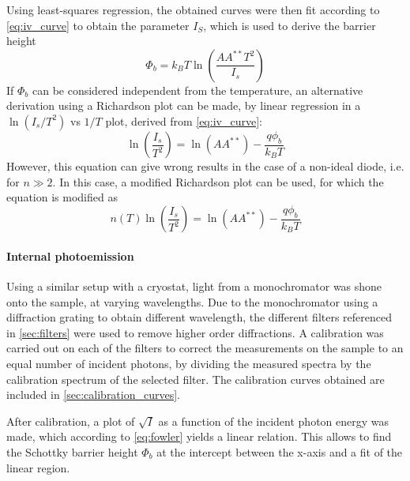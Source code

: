Using least-squares regression, the obtained curves were then fit according to \autoref{eq:iv_curve} to obtain the parameter $I_S$, which is used to derive the barrier height
\begin{equation}
    \Phi_b = k_B T \ln\left(\frac{A A^{**} T^2}{I_s}\right)
\end{equation}
If $\Phi_b$ can be considered independent from the temperature, an alternative derivation using a Richardson plot can be made, by linear regression in a $\ln(I_s/T^2)$ vs $1/T$ plot, derived from \autoref{eq:iv_curve}:
\begin{equation} \label{eq:richardson}
    \ln \left(\frac{I_s}{T^2}\right) = \ln(A A^{**}) - \frac{q \phi_b}{k_B T}
\end{equation}
However, this equation can give wrong results in the case of a non-ideal diode, i.e. for $n \gg 2$. In this case, a modified Richardson plot can be used, for which the equation is modified as \cite{bhuiyan_new_1988}
\begin{equation} \label{eq:modified_richardson}
    n(T) \ln \left(\frac{I_s}{T^2}\right) = \ln(A A^{**}) - \frac{q \phi_b}{k_B T}
\end{equation}

\paragraph{Internal photoemission}
Using a similar setup with a cryostat, light from a monochromator was shone onto the sample, at varying wavelengths.
Due to the monochromator using a diffraction grating to obtain different wavelength, the different filters referenced in \autoref{sec:filters} were used to remove higher order diffractions.
A calibration was carried out on each of the filters to correct the measurements on the sample to an equal number of incident photons, by dividing the measured spectra by the calibration spectrum of the selected filter.
The calibration curves obtained are included in \autoref{sec:calibration_curves}.

After calibration, a plot of $\sqrt{I}$ as a function of the incident photon energy was made, which according to \autoref{eq:fowler} yields a linear relation.
This allows to find the Schottky barrier height $\Phi_b$ at the intercept between the x-axis and a fit of the linear region.

